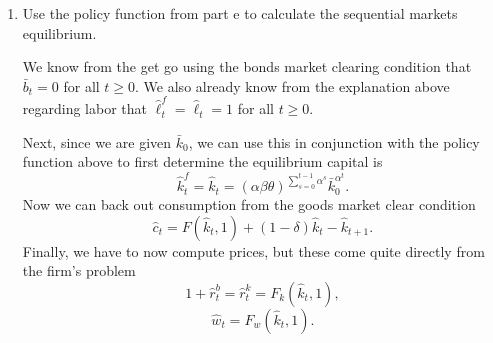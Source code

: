 \documentclass[11pt,english]{article}
\begin{document}
\begin{enumerate}[label=(\alph*)]
\begin{solution}
\begin{align*}
\frac{\partial }{\partial k'}\left[\log(\theta k^\alpha - k') + \beta V(k')\right] &= 0\\
- \frac{1}{\theta k^\alpha - k'} + \beta \frac{a_1}{k'} &= 0\\
k' &= \beta a_1(\theta k^\alpha - k')\\
k' &= \frac{a_1\beta\theta k^\alpha}{1 + a_1\beta}
\end{align*} Now we just need to determine what the value of $a_1$ is to be. To do so, we can plug the optimal $k'$ back into the bellman equation.
\begin{align*}
V(k) &= \max_{k'}\left\{\log(\theta k^\alpha - k') + \beta V(k')\right\},\\
a_0 + a_1\log(k) &= \log\left(\theta k^\alpha - \frac{a_1\beta\theta k^\alpha}{1 + a_1\beta}\right) + \beta a_0 + \beta a_1 \log\left(\frac{a_1\beta\theta k^\alpha}{1 + a_1\beta}\right),\\
a_0 + a_1\log(k) &= \log\left(\frac{\theta k^\alpha}{1 + a_1\beta}\right) + \beta a_0 + \beta a_1 \log\left(\frac{a_1\beta\theta k^\alpha}{1 + a_1\beta}\right),\\
a_0 + a_1\log(k) &= \beta a_0  + \log\left(\frac{\theta}{1 + a_1\beta}\right) \beta a_1 \log\left(\frac{a_1\beta\theta}{1 + a_1\beta}\right)+ \alpha\log\left(k\right) + \beta a_1 \alpha \log\left(k\right),\\
a_1 &= \alpha + \beta \alpha a_1,\\
a_1 &= \frac{\alpha}{1 - \beta\alpha}.
\end{align*} Now, we can finally classify the policy function as $$\boxed{k' = g(k) = \alpha \beta \theta k^\alpha.}$$
\end{solution}
    \item Use the policy function from part e to calculate the sequential markets equilibrium.
\begin{solution}
We know from the get go using the bonds market clearing condition that $\bar{b}_t = 0$ for all $t\geq 0$. We also already know from the explanation above regarding labor that $\hat{\ell}^f_t = \hat{\ell}_t = 1$ for all $t\geq 0$.

Next, since we are given $\bar{k}_0$, we can use this in conjunction with the policy function above to first determine the equilibrium capital is $$\hat{k}_t^f = \hat{k}_t = \left(\alpha\beta\theta\right)^{\sum_{s=0}^{t-1}\alpha^s}\bar{k}_0^{\alpha^t}.$$ Now we can back out consumption from the goods market clear condition $$\hat{c}_t = F(\hat{k}_t, 1) + (1 - \delta)\hat{k}_t - \hat{k}_{t+1}.$$ Finally, we have to now compute prices, but these come quite directly from the firm's problem $$1 + \hat{r}^b_t = \hat{r}^k_t = F_k(\hat{k}_t,1),$$
$$\hat{w}_t = F_w(\hat{k}_t, 1).$$
\end{solution}
\end{enumerate}
\end{document}
